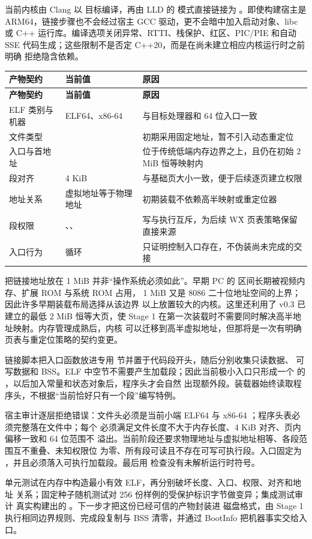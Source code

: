 当前内核由 Clang 以  目标编译，再由 LLD 的
 模式直接链接为 。即使构建宿主是
ARM64，链接步骤也不会经过宿主 GCC 驱动，更不会暗中加入启动对象、libc 或
C++ 运行库。编译选项关闭异常、RTTI、栈保护、红区、PIC/PIE 和自动 SSE
代码生成；这些限制不是否定 C++20，而是在尚未建立相应内核运行时之前明确
拒绝隐含依赖。

\begin{longtable}{L{0.26\textwidth}L{0.24\textwidth}L{0.38\textwidth}}
\toprule
\textbf{产物契约} & \textbf{当前值} & \textbf{原因}\\
\midrule
\endfirsthead
\toprule
\textbf{产物契约} & \textbf{当前值} & \textbf{原因}\\
\midrule
\endhead
ELF 类别与机器 & ELF64、x86-64 & 与目标处理器和 64 位入口一致\\
文件类型 &  & 初期采用固定地址，暂不引入动态重定位\\
入口与首地址 &  & 位于传统低端内存边界之上，且仍在初始
2 MiB 恒等映射内\\
段对齐 & 4 KiB & 与基础页大小一致，便于后续逐页建立权限\\
地址关系 & 虚拟地址等于物理地址 & 初期装载不依赖高半映射或重定位器\\
段权限 & 、、 & 写与执行互斥，为后续 W\^X
页表策略保留直接来源\\
入口行为 &  循环 & 只证明控制入口存在，不伪装尚未完成的交接\\
\bottomrule
\end{longtable}

把链接地址放在 1 MiB 并非“操作系统必须如此”。早期 PC 的
 区间长期被视频内存、扩展 ROM 与系统 ROM 占用，
1 MiB 又是 8086 二十位地址空间的上界；因此许多早期装载布局选择从该边界
以上放置较大的内核。这里还利用了 v0.3 已建立的最低 2 MiB 恒等大页，使
Stage 1 在第一次装载时不需要同时解决高半地址映射。内存管理成熟后，内核
可以迁移到高半虚拟地址，但那将是一次有明确页表与重定位策略的契约变更。

链接脚本把入口函数放进专用
 节并置于代码段开头，随后分别收集只读数据、
可写数据和 BSS。ELF 中空节不需要产生加载段；因此当前极小入口只形成一个
 的 ，以后加入常量和状态对象后，程序头才会自然
出现额外段。装载器始终读取程序头，不根据“当前恰好只有一个段”编写特例。

宿主审计逐层拒绝错误：文件头必须是当前小端 ELF64 与 x86-64
；程序头表必须完整落在文件中；每个 
必须满足文件长度不大于内存长度、4 KiB 对齐、页内偏移一致和 64 位范围不
溢出。当前阶段还要求物理地址与虚拟地址相等、各段范围互不重叠、未知权限位
为零、所有段可读且不存在可写可执行段。入口固定为
，并且必须落入可执行加载段。最后用
 检查没有未解析运行时符号。

单元测试在内存中构造最小有效 ELF，再分别破坏长度、入口、权限、对齐和地址
关系；固定种子随机测试对 256 份样例的受保护标识字节做变异；集成测试审计
真实构建出的 。下一步才把这份已经可信的产物封装进
磁盘格式，由 Stage 1 执行相同边界规则、完成段复制与 BSS 清零，并通过
BootInfo 把机器事实交给入口。

